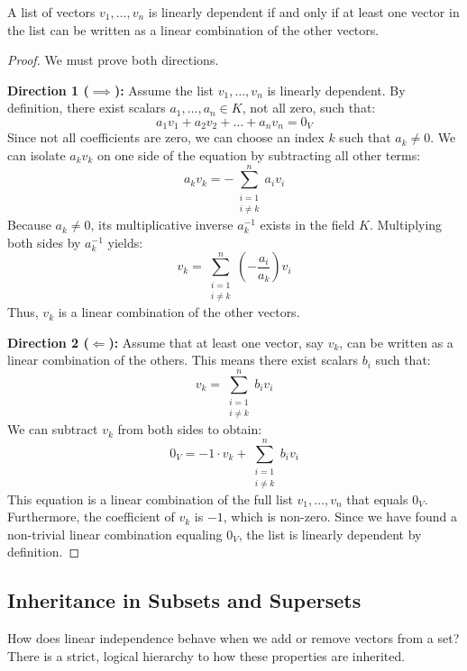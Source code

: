 \begin{proposition}
A list of vectors $v_1, \dots, v_n$ is linearly dependent if and only if at least one vector in the list can be written as a linear combination of the other vectors.
\end{proposition}

\begin{proof}
We must prove both directions.

\textbf{Direction 1 ($\implies$):} 
Assume the list $v_1, \dots, v_n$ is linearly dependent. By definition, there exist scalars $a_1, \dots, a_n \in K$, not all zero, such that:
\[
a_1 v_1 + a_2 v_2 + \dots + a_n v_n = 0_V
\]
Since not all coefficients are zero, we can choose an index $k$ such that $a_k \ne 0$. We can isolate $a_k v_k$ on one side of the equation by subtracting all other terms:
\[
a_k v_k = - \sum_{\substack{i=1 \\ i \ne k}}^n a_i v_i
\]
Because $a_k \ne 0$, its multiplicative inverse $a_k^{-1}$ exists in the field $K$. Multiplying both sides by $a_k^{-1}$ yields:
\[
v_k = \sum_{\substack{i=1 \\ i \ne k}}^n \left( -\frac{a_i}{a_k} \right) v_i
\]
Thus, $v_k$ is a linear combination of the other vectors.

\textbf{Direction 2 ($\Longleftarrow$):} 
Assume that at least one vector, say $v_k$, can be written as a linear combination of the others. This means there exist scalars $b_i$ such that:
\[
v_k = \sum_{\substack{i=1 \\ i \ne k}}^n b_i v_i
\]
We can subtract $v_k$ from both sides to obtain:
\[
0_V = -1 \cdot v_k + \sum_{\substack{i=1 \\ i \ne k}}^n b_i v_i
\]
This equation is a linear combination of the full list $v_1, \dots, v_n$ that equals $0_V$. Furthermore, the coefficient of $v_k$ is $-1$, which is non-zero. Since we have found a non-trivial linear combination equaling $0_V$, the list is linearly dependent by definition.
\end{proof}

\subsection{Inheritance in Subsets and Supersets}

How does linear independence behave when we add or remove vectors from a set? There is a strict, logical hierarchy to how these properties are inherited. 

